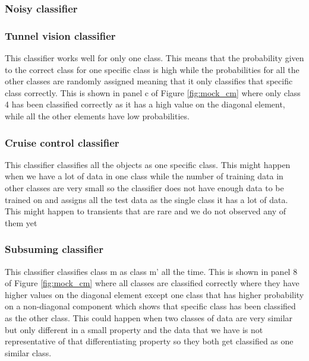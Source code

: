 \subsubsection{Noisy classifier}
\label{sec:nois_datay}


\subsubsection{Tunnel vision classifier}
\label{sec:tunnel_data}

This classifier works well for only one class. This means that the probability given to the correct class for one specific class is high while the probabilities for all the other classes are randomly assigned meaning that it only classifies that specific class correctly. This is shown in panel c of Figure \ref{fig:mock_cm} where only class 4 has been classified correctly as it has a high value on the diagonal element, while all the other elements have low probabilities.

\subsubsection{Cruise control classifier}
\label{sec:cruise_data}

This classifier classifies all the objects as one specific class. This might happen when we have a lot of data in one class while the number of training data in other classes are very small so the classifier does not have enough data to be trained on and assigns all the test data as the single class it has a lot of data. This might happen to transients that are rare and we do not observed any of them yet 

\subsubsection{Subsuming classifier}
\label{sec:subsume_data}

This classifier classifies class m as class m' all the time. This is shown in panel 8 of Figure \ref{fig:mock_cm}  where all classes are classified correctly where they have higher values on the diagonal element except one class that has higher probability on a non-diagonal component which shows that specific class has been classified as the other class. This could happen when two classes of data are very similar but only different in a small property and the data that we have is not representative of that differentiating property so they both get classified as one similar class. 

